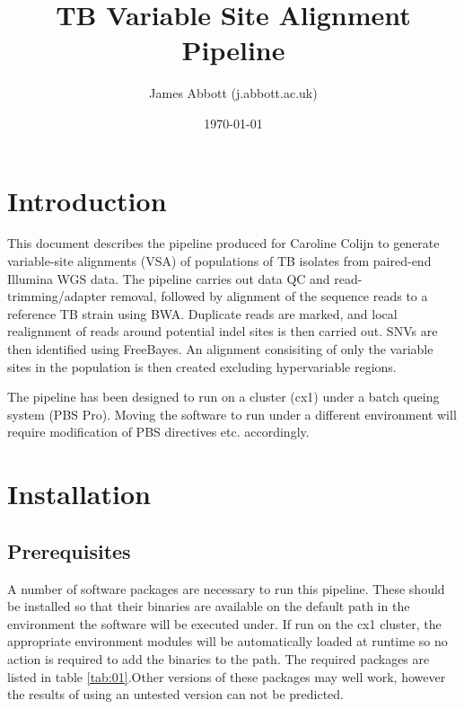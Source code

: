 \documentclass[a4paper,10pt,twoside]{article}
\title{TB Variable Site Alignment Pipeline}
\date{\today}
\author{James Abbott (j.abbott\@imperial.ac.uk)}
\begin{document}
\maketitle
\thispagestyle{fancy} %

\tableofcontents

\section{Introduction}

This document describes the pipeline produced for Caroline Colijn to generate
variable-site alignments (VSA) of populations of TB isolates from paired-end
Illumina WGS data. The pipeline carries out data QC and read-trimming/adapter
removal, followed by alignment of the sequence reads to a reference TB strain
using BWA.  Duplicate reads are marked, and local realignment of reads around
potential indel sites is then carried out. SNVs are then identified using
FreeBayes. An alignment consisiting of only the variable sites in the
population is then created excluding hypervariable regions.

The pipeline has been designed to run on a cluster (cx1) under a batch queing
system (PBS Pro). Moving the software to run under a different environment will
require modification of PBS directives etc. accordingly.

\section{Installation}

\subsection{Prerequisites}

A number of software packages are necessary to run this pipeline. These should
be installed so that their binaries are available on the default path in the
environment the software will be executed under. If run on the cx1 cluster, the
appropriate environment modules will be automatically loaded at runtime so no
action is required to add the binaries to the path. The required packages are
listed in table \ref{tab:01}.Other versions of these packages may well work,
however the results of using an untested version can not be predicted.
\end{document}
